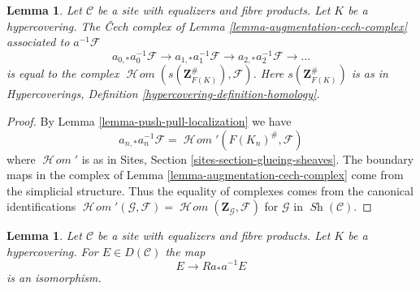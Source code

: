 \documentclass{stacks-project}
\theoremstyle{plain}
\newtheorem{lemma}[subsection]{Lemma}
\theoremstyle{definition}
\theoremstyle{remark}
\numberwithin{equation}{subsection}
\def\SheafHom{\mathop{\mathcal{H}\!\mathit{om}}\nolimits}
\def\Sh{\mathop{\mathit{Sh}}\nolimits}
\begin{document}
\begin{lemma}
\label{lemma-hypercovering-cech-complex}
Let $\mathcal{C}$ be a site with equalizers and fibre products.
Let $K$ be a hypercovering. The {\v C}ech complex
of Lemma \ref{lemma-augmentation-cech-complex} associated to
$a^{-1}\mathcal{F}$
$$
a_{0, *}a_0^{-1}\mathcal{F} \to a_{1, *}a_1^{-1}\mathcal{F} \to
a_{2, *}a_2^{-1}\mathcal{F} \to \ldots
$$
is equal to the complex $\SheafHom(s(\mathbf{Z}_{F(K)}^\#), \mathcal{F})$.
Here $s(\mathbf{Z}_{F(K)}^\#)$ is as in
Hypercoverings, Definition \ref{hypercovering-definition-homology}.
\end{lemma}

\begin{proof}
By Lemma \ref{lemma-push-pull-localization} we have
$$
a_{n, *}a_n^{-1}\mathcal{F} = \SheafHom'(F(K_n)^\#, \mathcal{F})
$$
where $\SheafHom'$ is as in Sites, Section \ref{sites-section-glueing-sheaves}.
The boundary maps in the complex of
Lemma \ref{lemma-augmentation-cech-complex}
come from the simplicial structure.
Thus the equality of complexes comes 
from the canonical identifications
$\SheafHom'(\mathcal{G}, \mathcal{F}) =
\SheafHom(\mathbf{Z}_\mathcal{G}, \mathcal{F})$ for
$\mathcal{G}$ in $\Sh(\mathcal{C})$.
\end{proof}

\begin{lemma}
\label{lemma-hypercovering-descent-bounded-abelian}
Let $\mathcal{C}$ be a site with equalizers and fibre products.
Let $K$ be a hypercovering. For
$E \in D(\mathcal{C})$ the map
$$
E \longrightarrow Ra_*a^{-1}E
$$
is an isomorphism.
\end{lemma}
\end{document}
